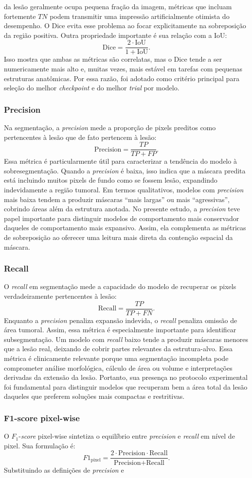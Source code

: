 \documentclass[tcc,capa]{texufpel}
\begin{document}
da lesão geralmente ocupa pequena fração da imagem, métricas que incluam fortemente \(TN\) podem transmitir uma impressão artificialmente otimista do desempenho. O Dice evita esse problema ao focar explicitamente na sobreposição da região positiva. Outra propriedade importante é sua relação com a IoU: \[ \text{Dice} = \frac{2 \cdot \text{IoU}}{1 + \text{IoU}}. \] Isso mostra que ambas as métricas são correlatas, mas o Dice tende a ser numericamente mais alto e, muitas vezes, mais estável em tarefas com pequenas estruturas anatômicas. Por essa razão, foi adotado como critério principal para seleção do melhor \textit{checkpoint} e do melhor \textit{trial} por modelo. \subsubsection{Precision} Na segmentação, a \textit{precision} mede a proporção de pixels preditos como pertencentes à lesão que de fato pertencem à lesão: \[ \text{Precision} = \frac{TP}{TP+FP}. \] Essa métrica é particularmente útil para caracterizar a tendência do modelo à sobresegmentação. Quando a \textit{precision} é baixa, isso indica que a máscara predita está incluindo muitos pixels de fundo como se fossem lesão, expandindo indevidamente a região tumoral. Em termos qualitativos, modelos com \textit{precision} mais baixa tendem a produzir máscaras “mais largas” ou mais “agressivas”, cobrindo áreas além da estrutura anotada. No presente estudo, a \textit{precision} teve papel importante para distinguir modelos de comportamento mais conservador daqueles de comportamento mais expansivo. Assim, ela complementa as métricas de sobreposição ao oferecer uma leitura mais direta da contenção espacial da máscara. \subsubsection{Recall} O \textit{recall} em segmentação mede a capacidade do modelo de recuperar os pixels verdadeiramente pertencentes à lesão: \[ \text{Recall} = \frac{TP}{TP+FN}. \] Enquanto a \textit{precision} penaliza expansão indevida, o \textit{recall} penaliza omissão de área tumoral. Assim, essa métrica é especialmente importante para identificar subsegmentação. Um modelo com \textit{recall} baixo tende a produzir máscaras menores que a lesão real, deixando de cobrir partes relevantes da estrutura-alvo. Essa métrica é clinicamente relevante porque uma segmentação incompleta pode comprometer análise morfológica, cálculo de área ou volume e interpretações derivadas da extensão da lesão. Portanto, sua presença no protocolo experimental foi fundamental para distinguir modelos que recuperam bem a área total da lesão daqueles que preferem soluções mais compactas e restritivas. \subsubsection{F1-score pixel-wise} O \(F_1\)-\textit{score} pixel-wise sintetiza o equilíbrio entre \textit{precision} e \textit{recall} em nível de pixel. Sua formulação é: \[ F1_{\text{pixel}} = \frac{2 \cdot \text{Precision} \cdot \text{Recall}} {\text{Precision} + \text{Recall}}. \] Substituindo as definições de \textit{precision} e 
\end{document}
